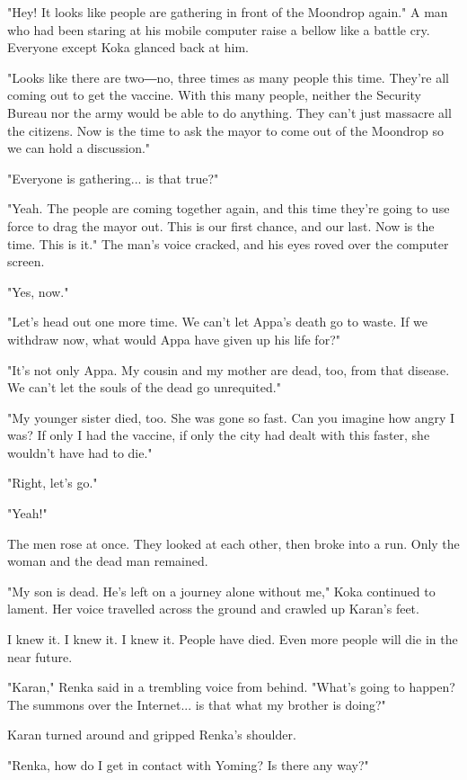 "Hey! It looks like people are gathering in front of the Moondrop
again." A man who had been staring at his mobile computer raise a bellow
like a battle cry. Everyone except Koka glanced back at him.

"Looks like there are two―no, three times as many people this time.
They're all coming out to get the vaccine. With this many people,
neither the Security Bureau nor the army would be able to do anything.
They can't just massacre all the citizens. Now is the time to ask the
mayor to come out of the Moondrop so we can hold a discussion."

"Everyone is gathering... is that true?"

"Yeah. The people are coming together again, and this time they're going
to use force to drag the mayor out. This is our first chance, and our
last. Now is the time. This is it." The man's voice cracked, and his
eyes roved over the computer screen.

"Yes, now."

"Let's head out one more time. We can't let Appa's death go to waste. If
we withdraw now, what would Appa have given up his life for?"

"It's not only Appa. My cousin and my mother are dead, too, from that
disease. We can't let the souls of the dead go unrequited."

"My younger sister died, too. She was gone so fast. Can you imagine how
angry I was? If only I had the vaccine, if only the city had dealt with
this faster, she wouldn't have had to die."

"Right, let's go."

"Yeah!"

The men rose at once. They looked at each other, then broke into a run.
Only the woman and the dead man remained.

"My son is dead. He's left on a journey alone without me," Koka
continued to lament. Her voice travelled across the ground and crawled
up Karan's feet.

I knew it. I knew it. I knew it. People have died. Even more people will
die in the near future.

"Karan," Renka said in a trembling voice from behind. "What's going to
happen? The summons over the Internet... is that what my brother is
doing?"

Karan turned around and gripped Renka's shoulder.

"Renka, how do I get in contact with Yoming? Is there any way?"

